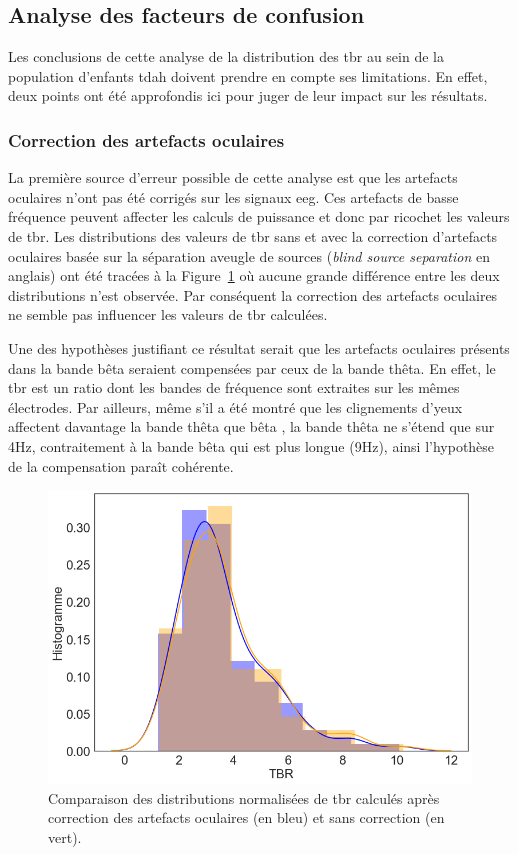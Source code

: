 \subsection{Analyse des facteurs de confusion}

Les conclusions de cette analyse de la distribution des \gls{tbr} au sein de la population d'enfants \gls{tdah} doivent prendre en compte ses limitations.
En effet, deux points ont été approfondis ici pour juger de leur impact sur les résultats.

\subsubsection{Correction des artefacts oculaires}

La première source d'erreur possible de cette analyse est que les artefacts oculaires n'ont pas été corrigés sur les signaux \gls{eeg}. Ces artefacts de basse fréquence
peuvent affecter les calculs de puissance et donc par ricochet les valeurs de \gls{tbr}. Les distributions des valeurs de \gls{tbr} sans et avec 
la correction d'artefacts oculaires basée sur la séparation aveugle de sources (\textit{blind source separation} en anglais) \citep{Barthelemy2017} 
ont été tracées à la Figure~\ref{Figure:tbr_eye_artifact_correction} où aucune grande différence entre les deux distributions n'est observée. Par conséquent la correction des artefacts 
oculaires ne semble pas influencer les valeurs de \gls{tbr} calculées. 

Une des hypothèses justifiant ce 
résultat serait que les artefacts oculaires présents dans la bande bêta seraient compensées par ceux de la bande thêta. En effet, le \gls{tbr} est un ratio dont les bandes de
fréquence sont extraites sur les mêmes électrodes. Par ailleurs, même s'il a été montré que les clignements d'yeux affectent davantage la bande thêta que bêta \citep{Barthelemy2017},
la bande thêta ne s'étend que sur 4Hz, contraitement à la bande bêta qui est plus longue (9Hz), ainsi l'hypothèse de la compensation paraît cohérente.


\begin{figure}[h!]
  \centering
	\includegraphics[width=0.7\linewidth]{figures/chapter-4/tbr-eye-artifact-correction} 
  \caption[Comparaison des distributions normalisées de \gls{tbr} calculés après correction des artefacts 
	oculaires et sans correction.]{Comparaison des distributions normalisées de \gls{tbr} calculés après correction des artefacts oculaires (en bleu) et sans correction (en vert).}
  \label{Figure:tbr_eye_artifact_correction}
\end{figure}

